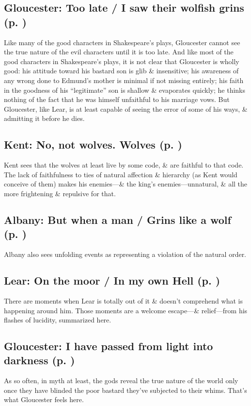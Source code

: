 \subsection{Gloucester: Too late / I saw their wolfish grins (p. \pageref{ch:lear_at})}

Like many of the good characters in Shakespeare's plays, Gloucester cannot see the true nature of the evil characters until it is too late. And like most of the good characters in Shakespeare's plays, it is not clear that Gloucester is wholly good: his attitude toward his bastard son is glib \& insensitive; his awareness of any wrong done to Edmund's mother is minimal if not missing entirely; his faith in the goodness of his ``legitimate'' son is shallow \& evaporates quickly; he thinks nothing of the fact that he was himself unfaithful to his marriage vows. But Gloucester, like Lear, is at least capable of seeing the error of some of his ways, \& admitting it before he dies.

\subsection{Kent: No, not wolves. Wolves (p. \pageref{ch:lear_au})}
Kent sees that the wolves at least live by some code, \& are faithful to that code. The lack of faithfulness to ties of natural affection \& hierarchy (as Kent would conceive of them) makes his enemies---\& the king's enemies---unnatural, \& all the more frightening \& repulsive for that.

\subsection{Albany: But when a man / Grins like a wolf (p. \pageref{ch:lear_av})}
Albany also sees unfolding events as representing a violation of the natural order.

\subsection{Lear: On the moor / In my own Hell (p. \pageref{ch:lear_aw})}
There are moments when Lear is totally out of it \& doesn't comprehend what is happening around him. Those moments are a welcome escape---\& relief---from his flashes of lucidity, summarized here.

\subsection{Gloucester: I have passed from light into darkness (p. \pageref{ch:lear_ax})}
As so often, in myth at least, the gods reveal the true nature of the world only once they have blinded the poor bastard they've subjected to their whims. That's what Gloucester feels here.


